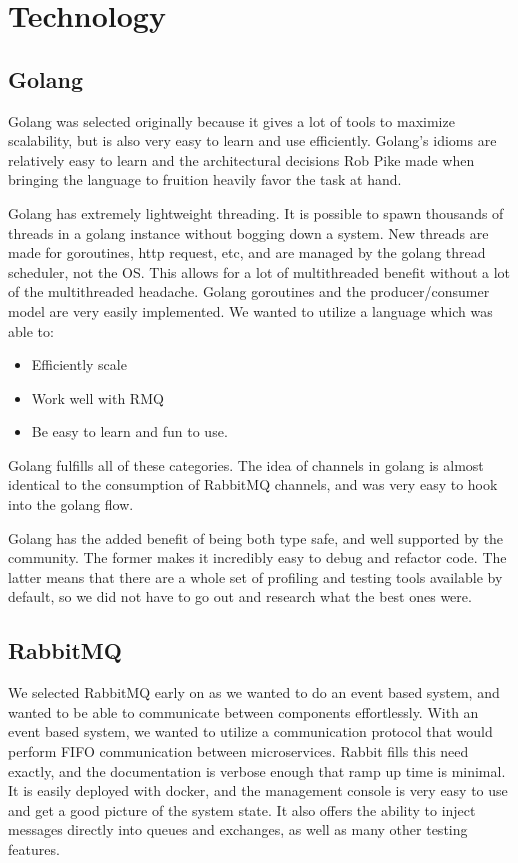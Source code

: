 \section{Technology}

\subsection{Golang}
Golang was selected originally because it gives a lot of tools to maximize scalability, but is also very easy to learn and use efficiently.
Golang’s idioms are relatively easy to learn and the architectural decisions Rob Pike made when bringing the language to fruition heavily favor the task at hand.

Golang has extremely lightweight threading.
It is possible to spawn thousands of threads in a golang instance without bogging down a system.
New threads are made for goroutines, http request, etc, and are managed by the golang thread scheduler, not the OS.
This allows for a lot of multithreaded benefit without a lot of the multithreaded headache.
Golang goroutines and the producer/consumer model are very easily implemented.
We wanted to utilize a language which was able to:

\begin{itemize}
  \item Efficiently scale
  \item Work well with RMQ
  \item Be easy to learn and fun to use.
\end{itemize}

Golang fulfills all of these categories.
The idea of channels in golang is almost identical to the consumption of RabbitMQ channels, and was very easy to hook into the golang flow.

Golang has the added benefit of being both type safe, and well supported by the community.
The former makes it incredibly easy to debug and refactor code.
The latter means that there are a whole set of profiling and testing tools available by default, so we did not have to go out and research what the best ones were.

\subsection{RabbitMQ}
We selected RabbitMQ early on as we wanted to do an event based system, and wanted to be able to communicate between components effortlessly.
With an event based system, we wanted to utilize a communication protocol that would perform FIFO communication between microservices.
Rabbit fills this need exactly, and the documentation is verbose enough that ramp up time is minimal.
It is easily deployed with docker, and the management console is very easy to use and get a good picture of the system state.
It also offers the ability to inject messages directly into queues and exchanges, as well as many other testing features.


